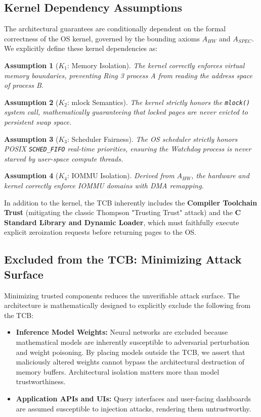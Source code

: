 \documentclass[conference]{IEEEtran}
\newtheorem{assumption}{Assumption}
\begin{document}
\subsection{Kernel Dependency Assumptions}
The architectural guarantees are conditionally dependent on the formal correctness of the OS kernel, governed by the bounding axioms $A_{HW}$ and $A_{SPEC}$. We explicitly define these kernel dependencies as:
\begin{assumption}[$K_1$: Memory Isolation] 
The kernel correctly enforces virtual memory boundaries, preventing Ring 3 process A from reading the address space of process B. 
\end{assumption}
\begin{assumption}[$K_2$: mlock Semantics] 
The kernel strictly honors the \texttt{mlock()} system call, mathematically guaranteeing that locked pages are never evicted to persistent swap space. 
\end{assumption}
\begin{assumption}[$K_3$: Scheduler Fairness] 
The OS scheduler strictly honors POSIX \texttt{SCHED\_FIFO} real-time priorities, ensuring the Watchdog process is never starved by user-space compute threads. 
\end{assumption}
\begin{assumption}[$K_4$: IOMMU Isolation]
Derived from $A_{HW}$, the hardware and kernel correctly enforce IOMMU domains with DMA remapping.
\end{assumption}

In addition to the kernel, the TCB inherently includes the \textbf{Compiler Toolchain Trust} (mitigating the classic Thompson "Trusting Trust" attack) and the \textbf{C Standard Library and Dynamic Loader}, which must faithfully execute explicit zeroization requests before returning pages to the OS.

\subsection{Excluded from the TCB: Minimizing Attack Surface}
Minimizing trusted components reduces the unverifiable attack surface. The architecture is mathematically designed to explicitly exclude the following from the TCB:
\begin{itemize}
    \item \textbf{Inference Model Weights:} Neural networks are excluded because mathematical models are inherently susceptible to adversarial perturbation and weight poisoning. By placing models outside the TCB, we assert that maliciously altered weights cannot bypass the architectural destruction of memory buffers. Architectural isolation matters more than model trustworthiness.
    \item \textbf{Application APIs and UIs:} Query interfaces and user-facing dashboards are assumed susceptible to injection attacks, rendering them untrustworthy.
\end{itemize}
\end{document}
